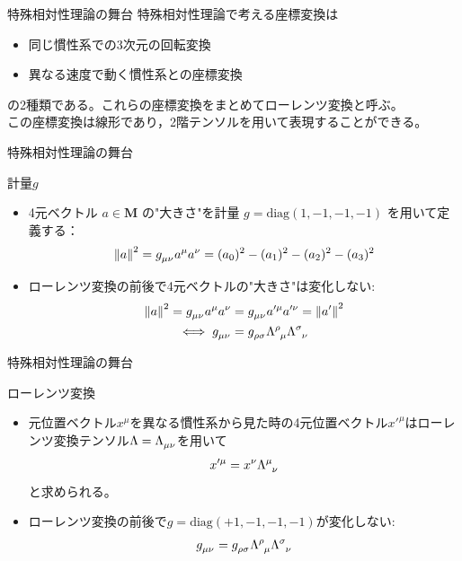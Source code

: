 \documentclass[unicode, aspectratio=169, 12pt]{beamer}
\begin{document}
\begin{frame}{特殊相対性理論の舞台}
    特殊相対性理論で考える座標変換は
    \begin{itemize}
        \item 同じ慣性系での3次元の回転変換
        \item 異なる速度で動く慣性系との座標変換
    \end{itemize}
    の2種類である。これらの座標変換をまとめてローレンツ変換と呼ぶ。\\
    この座標変換は線形であり，2階テンソルを用いて表現することができる。
\end{frame}

\begin{frame}{特殊相対性理論の舞台}
    \begin{block}{計量$g$}
        \begin{itemize}
            \item 4元ベクトル $a \in \bm{M}$ の"大きさ"を計量 $g = \mathrm{diag}(1, -1, -1, -1)$ を用いて定義する：
            \begin{equation*}
                \norm{a}^2 =  \tensor{g}{_\mu_\nu} a^\mu a^\nu  = (a_0)^2-(a_1)^2-(a_2)^2-(a_3)^2
            \end{equation*}
            \item ローレンツ変換の前後で4元ベクトルの"大きさ"は変化しない:
            \begin{align*}
                \norm{a}^2=\tensor{g}{_\mu_\nu} a^\mu a^\nu&=\tensor{g}{_\mu_\nu} a'^\mu a'^\nu=\norm{a'}^2\\
                \iff
                \tensor{g}{_\mu_\nu}&=\tensor{g}{_\rho_\sigma} \tensor{\Lambda}{^\rho_\mu}\tensor{\Lambda}{^\sigma_\nu}
            \end{align*}
            
        \end{itemize}        
    \end{block}
\end{frame}

\begin{frame}{特殊相対性理論の舞台}
    \begin{block}{ローレンツ変換}
        \begin{itemize}
            \item 元位置ベクトル$x^\mu$を異なる慣性系から見た時の4元位置ベクトル$x'^\mu$はローレンツ変換テンソル$\Lambda=\tensor{\Lambda}{_\mu_\nu}$を用いて
            \begin{align*}
                x'^\mu = x^\nu \tensor{\Lambda}{^\mu_\nu}
            \end{align*}
        と求められる。\\
        \item ローレンツ変換の前後で$g=\mathrm{diag}(+1,-1,-1,-1)$が変化しない:
            \begin{align*}
                \tensor{g}{_\mu_\nu}&=\tensor{g}{_\rho_\sigma}\tensor{\Lambda}{^\rho_\mu}\tensor{\Lambda}{^\sigma_\nu}\\
            \end{align*}
        \end{itemize}
    \end{block}    
\end{frame}
\end{document}
